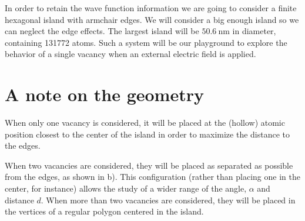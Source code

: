 In order to retain the wave function information we are going to consider a finite hexagonal island with armchair edges. We will consider a big enough island so we can neglect the edge effects. The largest island will be $\SI{50.6}{\nm}$ in diameter, containing 131772 atoms.  %
Such a system will be our playground to explore the behavior of a single vacancy when an external electric field is applied.

\section{A note on the geometry}

When only one vacancy is considered, it will be placed at the (hollow) atomic position closest to the center of the island in order to maximize the distance to the edges.

When two vacancies are considered, they will be placed as separated as possible from the edges, as shown in b). This configuration (rather than placing one in the center, for instance) allows the study of a wider range of the angle, $\alpha$ and distance $d$.
When more than two vacancies are considered, they will be placed in the vertices of a regular polygon centered in the island.


